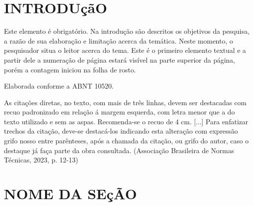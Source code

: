 \documentclass[
  oneside, %
  english,
  brazil
]{abntbibufjf}
\begin{document}

\tableofcontents*
\cleardoublepage


\textual


\chapter{INTRODUçãO}  %

Este elemento é obrigatório. Na introdução são descritos os objetivos da pesquisa, a razão de sua elaboração e limitação acerca da
temática. Neste momento, o pesquisador situa o leitor acerca do tema. Este é o primeiro elemento textual e a partir dele a numeração de página
estará visível na parte superior da página, porém a contagem iniciou na folha de rosto.

Elaborada conforme a ABNT 10520.

\begin{citacao}
  As citações diretas, no texto, com mais de três linhas, devem ser destacadas
  com recuo padronizado em relação á margem esquerda, com letra menor que a do texto utilizado
  e sem as aspas. Recomenda-se o recuo de 4 cm. [...] Para enfatizar trechos da citação, deve-se destacá-los indicando esta
  alteração com expressão grifo nosso entre parênteses, após a chamada da citação, ou grifo
  do autor, caso o destaque já faça parte da obra consultada. (Associação Brasileira de Normas
  Técnicas, 2023, p. 12-13)
\end{citacao}



\chapter{NOME DA SEç\~{A}O} %
\end{document}
